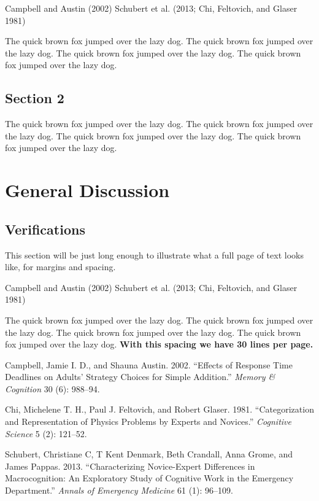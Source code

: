 \documentclass[12pt, a4paper]{report} %
\newlength{\cslhangindent}
\newenvironment{CSLReferences}[2] %
 {%
  \setlength{\parindent}{0pt}
  \ifodd #1 \everypar{\setlength{\hangindent}{\cslhangindent}}\ignorespaces\fi
  \ifnum #2 > 0
  \setlength{\parskip}{#2\baselineskip}
  \fi
 }%
 {}
\begin{document}
Campbell and Austin (2002) Schubert et al. (2013; Chi, Feltovich, and
Glaser 1981)

The quick brown fox jumped over the lazy dog. The quick brown fox jumped
over the lazy dog. The quick brown fox jumped over the lazy dog. The
quick brown fox jumped over the lazy dog.

\section{Section 2}
\label{Section2}

The quick brown fox jumped over the lazy dog. The quick brown fox jumped
over the lazy dog. The quick brown fox jumped over the lazy dog. The
quick brown fox jumped over the lazy dog.

\chapter*{General Discussion}
\parindent=5.3mm

\section{Verifications}
\label{sec:verify}

This section will be just long enough to illustrate what a full page of
text looks like, for margins and spacing.

Campbell and Austin (2002) Schubert et al. (2013; Chi, Feltovich, and
Glaser 1981)

The quick brown fox jumped over the lazy dog. The quick brown fox jumped
over the lazy dog. The quick brown fox jumped over the lazy dog. The
quick brown fox jumped over the lazy dog. \textbf{With this spacing we
have 30 lines per page.}

\hypertarget{refs}{}
\begin{CSLReferences}{1}{0}
\leavevmode{}%
Campbell, Jamie I. D., and Shauna Austin. 2002. {``Effects of Response
Time Deadlines on Adults' Strategy Choices for Simple Addition.''}
\emph{Memory \& Cognition} 30 (6): 988--94.

\leavevmode{}%
Chi, Michelene T. H., Paul J. Feltovich, and Robert Glaser. 1981.
{``Categorization and Representation of Physics Problems by Experts and
Novices.''} \emph{Cognitive Science} 5 (2): 121--52.

\leavevmode{}%
Schubert, Christiane C, T Kent Denmark, Beth Crandall, Anna Grome, and
James Pappas. 2013. {``Characterizing Novice-Expert Differences in
Macrocognition: An Exploratory Study of Cognitive Work in the Emergency
Department.''} \emph{Annals of Emergency Medicine} 61 (1): 96--109.

\end{CSLReferences}



\end{document}
